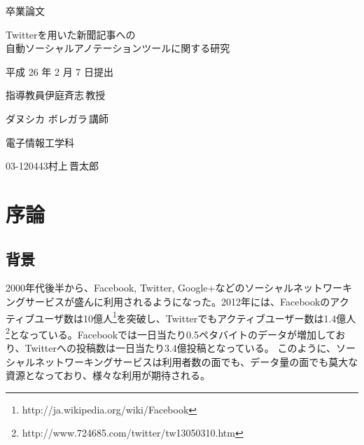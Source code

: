 \documentclass[12pt]{jarticle}
\begin{document}
\pagestyle{empty}
\begin{center}
  \vspace*{3.0cm}
  {\fontsize{80pt}{100pt}\selectfont 卒業論文}

  \vspace*{2.0cm}

  \begin{LARGE}
    Twitterを用いた新聞記事への\\
    自動ソーシャルアノテーションツールに関する研究
    \vspace*{2.0cm}

    平成 26 年 2 月 7 日提出
  \end{LARGE}

\end{center}
\begin{LARGE}
  \vspace*{1.0cm}
  \hspace{25mm}指導教員\hspace{51mm}伊庭斉志\,教授

  \hspace{70mm}ダヌシカ ボレガラ\,講師

  \vspace*{1.0cm}
  \begin{center}
    電子情報工学科

    \vspace{1.0cm}
    03-120443\hspace{15mm}村上\,晋太郎
  \end{center}

\end{LARGE}


\newpage
\tableofcontents

\newpage
\setcounter{page}{1}
\pagestyle{plain}

\section{序論}
\subsection{背景}
2000年代後半から、Facebook, Twitter, Google+などのソーシャルネットワーキングサービスが盛んに利用されるようになった。2012年には、Facebookのアクティブユーザ数は10億人\footnote{http://ja.wikipedia.org/wiki/Facebook}を突破し、Twitterでもアクティブユーザー数は1.4億人\footnote{http://www.724685.com/twitter/tw13050310.htm}となっている。Facebookでは一日当たり0.5ペタバイトのデータが増加しており、Twitterへの投稿数は一日当たり3.4億投稿となっている。
このように、ソーシャルネットワーキングサービスは利用者数の面でも、データ量の面でも莫大な資源となっており、様々な利用が期待される。
\end{document}
